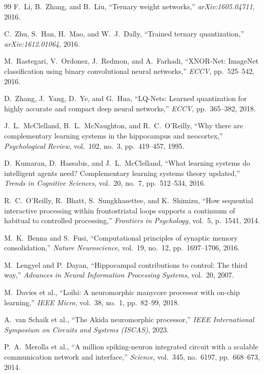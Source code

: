 \documentclass[11pt,letterpaper]{article}
\begin{document}
\begin{thebibliography}{99}
F.~Li, B.~Zhang, and B.~Liu, ``Ternary weight networks,'' \textit{arXiv:1605.04711}, 2016.

C.~Zhu, S.~Han, H.~Mao, and W.~J.~Dally, ``Trained ternary quantization,'' \textit{arXiv:1612.01064}, 2016.

M.~Rastegari, V.~Ordonez, J.~Redmon, and A.~Farhadi, ``XNOR-Net: ImageNet classification using binary convolutional neural networks,'' \textit{ECCV}, pp.~525--542, 2016.

D.~Zhang, J.~Yang, D.~Ye, and G.~Hua, ``LQ-Nets: Learned quantization for highly accurate and compact deep neural networks,'' \textit{ECCV}, pp.~365--382, 2018.

J.~L.~McClelland, B.~L.~McNaughton, and R.~C.~O'Reilly, ``Why there are complementary learning systems in the hippocampus and neocortex,'' \textit{Psychological Review}, vol.~102, no.~3, pp.~419--457, 1995.

D.~Kumaran, D.~Hassabis, and J.~L.~McClelland, ``What learning systems do intelligent agents need? Complementary learning systems theory updated,'' \textit{Trends in Cognitive Sciences}, vol.~20, no.~7, pp.~512--534, 2016.

R.~C.~O'Reilly, R.~Bhatt, S.~Sungkhasettee, and K.~Shimizu, ``How sequential interactive processing within frontostriatal loops supports a continuum of habitual to controlled processing,'' \textit{Frontiers in Psychology}, vol.~5, p.~1541, 2014.

M.~K.~Benna and S.~Fusi, ``Computational principles of synaptic memory consolidation,'' \textit{Nature Neuroscience}, vol.~19, no.~12, pp.~1697--1706, 2016.

M.~Lengyel and P.~Dayan, ``Hippocampal contributions to control: The third way,'' \textit{Advances in Neural Information Processing Systems}, vol.~20, 2007.

M.~Davies et al., ``Loihi: A neuromorphic manycore processor with on-chip learning,'' \textit{IEEE Micro}, vol.~38, no.~1, pp.~82--99, 2018.

A.~van Schaik et al., ``The Akida neuromorphic processor,'' \textit{IEEE International Symposium on Circuits and Systems (ISCAS)}, 2023.

P.~A.~Merolla et al., ``A million spiking-neuron integrated circuit with a scalable communication network and interface,'' \textit{Science}, vol.~345, no.~6197, pp.~668--673, 2014.


\end{thebibliography}
\end{document}

